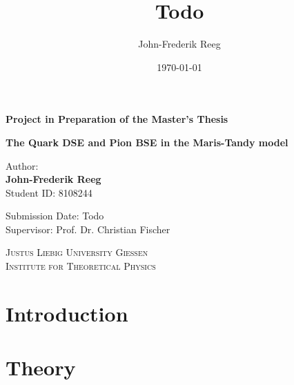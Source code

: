 \documentclass[oneside, openany]{book}
\title{Todo}
\author{John-Frederik Reeg}
\date{\today}
\numberwithin{equation}{chapter}
\numberwithin{figure}{chapter}
\begin{document}
\begin{titlepage}

\centering
\vspace*{0.8cm}

\LARGE
\textbf{Project in Preparation of the Master's Thesis}

\vspace*{1.5cm}

\Huge
\textbf{The Quark DSE and Pion BSE in the Maris-Tandy model}

\vspace*{1.2cm}

\Large
Author: \\ 
\textbf{John-Frederik Reeg} \\
Student ID: 8108244

\vspace*{1.5cm}

Submission Date: Todo \\
Supervisor: Prof. Dr. Christian Fischer \\

\vfill

\Large \textsc{
	Justus Liebig University Giessen \\ 
	Institute for Theoretical Physics}

\vspace*{1cm}

\end{titlepage}

\tableofcontents

\chapter{Introduction} \label{ch:1}


\chapter{Theory} \label{ch:2}
\end{document}
